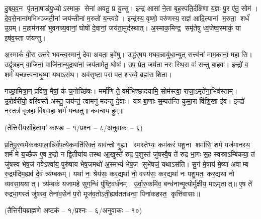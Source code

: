 दु॒श्च्य॒व॒न पृ॑तना॒षाड॑यु॒ध्योऽस्माक॒ सेना॑ अवतु॒ प्र यु॒त्सु। इन्द्र॑ आसां ने॒ता बृह॒स्पति॒र्दक्षि॑णा य॒ज्ञः पु॒र ए॑तु॒ सोम॑। दे॒व॒से॒नाना॑मभिभञ्जती॒नां जय॑न्तीनां म॒रुतो॑ य॒न्त्वग्रे। इन्द्र॑स्य॒ वृष्णो॒ वरु॑णस्य॒ राज्ञ॑ आदि॒त्यानां म॒रुता॒ शर्ध॑ उ॒ग्रम्। म॒हाम॑नसां भुवनच्य॒वानां॒ घोषो॑ दे॒वानां॒ जय॑ता॒मुद॑स्थात्। अ॒स्माक॒मिन्द्र॒ समृ॑तेषु ध्व॒जेष्व॒स्माकं॒ या इष॑व॒स्ता ज॑यन्तु।

अ॒स्माकं॑ वी॒रा उत्त॑रे भवन्त्व॒स्मानु॑ देवा अवता॒ हवे॑षु। उद्ध॑र्‌षय मघव॒न्नायु॑धा॒न्युत् सत्त्व॑नां माम॒कानां॒ महासि। उद्वृ॑त्रहन् वा॒जिनां॒ वाजि॑ना॒न्युद्रथा॑नां॒ जय॑तामेतु॒ घोषः॑। उप॒ प्रेत॒ जय॑ता नरः स्थि॒रा वः॑ सन्तु बा॒हवः॑। इन्द्रो॑ व॒ शर्म॑ यच्छत्त्वनाधृ॒ष्या यथाऽस॑थ। अव॑सृष्टा॒ परा॑ पत॒ शर॑व्ये॒ ब्रह्म॑सशिता।

गच्छा॒मित्रा॒न् प्रवि॑श॒ मैषां॒ कं च॒नोच्छि॑षः। मर्मा॑णि ते॒ वर्म॑भिश्छादयामि॒ सोम॑स्त्वा॒ राजा॒ऽमृते॑ना॒भिव॑स्ताम्। उ॒रोर्वरी॑यो॒ वरि॑वस्ते अस्तु॒ जय॑न्तं॒ त्वामनु॑ मदन्तु दे॒वाः। यत्र॑ बा॒णाः स॒म्पत॑न्ति कुमा॒रा वि॑शि॒खा इ॑व। इन्द्रो॑ न॒स्तत्र॑ वृत्र॒हा वि॑श्वा॒हा शर्म॑ यच्छतु॥
कवचाय हुम्॥

{\small \closesection}

\centerline{\normalsize (तैत्तिरीयसंहितायां काण्डः – १/प्रश्नः – ८/अनुवाकः – ६)}

प्र॒ति॒पू॒रु॒षमेक॑कपाला॒न्निर्व॑प॒त्येक॒मति॑रिक्तं॒ याव॑न्तो गृ॒ह्या स्मस्तेभ्यः॒ कम॑करं पशू॒ना शर्मा॑सि॒ शर्म॒ यज॑मानस्य॒ शर्म॑ मे य॒च्छैक॑ ए॒व रु॒द्रो न द्वि॒तीया॑य तस्थ आ॒खुस्ते॑ रुद्र प॒शुस्तं जु॑षस्वै॒ष ते॑ रुद्र भा॒गः स॒ह स्वस्राऽम्बि॑कया॒ तं जु॑षस्व भेष॒जं गवेऽश्वा॑य॒ पुरु॑षाय भेष॒जमथो॑ अ॒स्मभ्यं॑ भेष॒ज सुभे॑षजं॒ यथाऽस॑ति। सु॒गं मे॒षाय॑ मे॒ष्या॑ अवाम्ब रु॒द्रम॑दिम॒ह्यव॑ दे॒वं त्र्य॑म्बकम्। यथा॑ नः॒ श्रेय॑सः॒ कर॒द्यथा॑ नो॒ वस्य॑सः॒ कर॒द्यथा॑ नः पशु॒मतः॒ कर॒द्यथा॑ नो व्यवसा॒ययात्। त्र्य॑म्बकं यजामहे सुग॒न्धिं पु॑ष्टि॒वर्ध॑नम्। उ॒र्वा॒रु॒कमि॑व॒ बन्ध॑नान्मृ॒त्योर्मु॑क्षीय॒ माऽमृतात्॥ ए॒ष ते॑ रुद्रभा॒गस्तं जु॑षस्व॒ तेना॑व॒सेन॑ प॒रो मूज॑व॒तोऽती॒ह्यव॑ततधन्वा॒ पिना॑कहस्त॒ कृत्ति॑वासाः॥


\centerline{\normalsize (तैत्तिरीयब्राह्मणे अष्टकं – १/प्रश्नः – ६/अनुवाकः – १०)}

